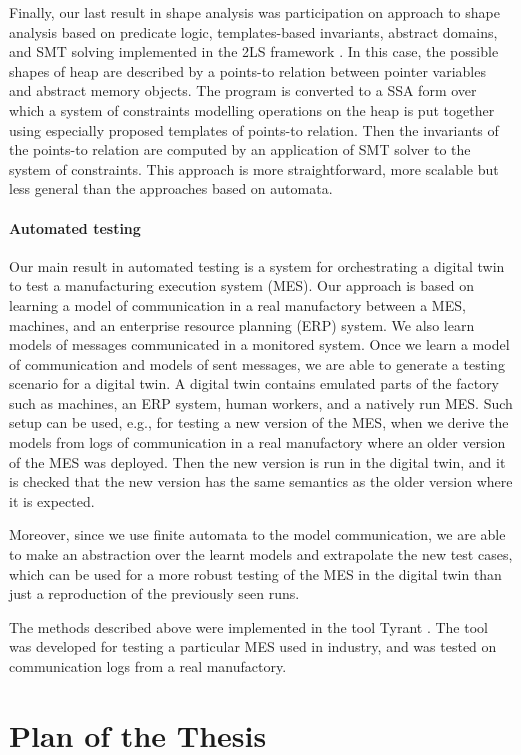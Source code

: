 Finally, our last result in shape analysis was participation on approach to shape analysis based on predicate logic, templates-based invariants, abstract domains, and SMT solving
implemented in the 2LS framework \cite{2ls:tacas}.
In this case, the possible shapes of heap are described by a points-to relation between pointer variables
and abstract memory objects.
The program is converted to a SSA form over which a system of constraints modelling
operations on the heap is put together using especially proposed templates of points-to relation.
Then the invariants of the points-to relation are computed by an application of SMT solver to the system of constraints.
This approach is more straightforward, more scalable but less general than the approaches based on automata.

\paragraph{Automated testing}
Our main result in automated testing is a system for orchestrating a digital twin to
test a manufacturing execution system (MES).
Our approach is based on learning a model of communication in a real manufactory between
a MES, machines, and an enterprise resource planning (ERP) system.
We also learn models of messages communicated in a monitored system.
Once we learn a model of communication and models of sent messages, we are able
to generate a testing scenario for a digital twin.
A digital twin contains emulated parts of the factory such as machines, an ERP system, human workers, and
a natively run MES.
Such setup can be used, e.g., for testing a new version of the MES, when we derive the models
from logs of communication in a real manufactory where an older version of the MES was deployed.
Then the new version is run in the digital twin, and it is checked that the new version has the same semantics
as the older version where it is expected.

Moreover, since we use finite automata to the model communication,
we are able to make an abstraction over the learnt models and extrapolate the new test
cases, which can be used for a more robust testing of the MES in the digital twin than just a reproduction
of the previously seen runs.

The methods described above were implemented in the tool Tyrant \cite{ref_tyrant}.
The tool was developed for testing a particular MES used in industry, and was tested
on communication logs from a real manufactory.

\section{Plan of the Thesis}

